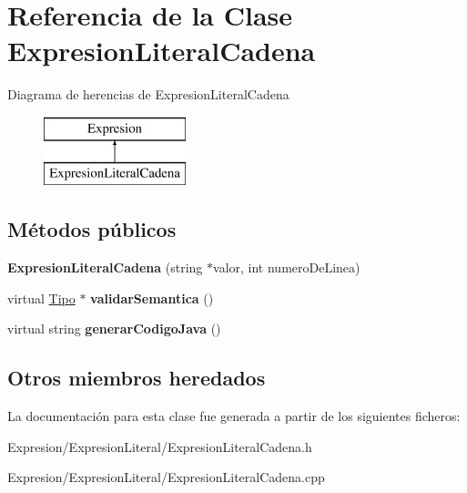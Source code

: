 \hypertarget{class_expresion_literal_cadena}{\section{Referencia de la Clase Expresion\-Literal\-Cadena}
\label{class_expresion_literal_cadena}
}
Diagrama de herencias de Expresion\-Literal\-Cadena\begin{figure}[H]
\begin{center}
\leavevmode
\includegraphics[height=2.000000cm]{class_expresion_literal_cadena}
\end{center}
\end{figure}
\subsection*{Métodos públicos}
\begin{DoxyCompactItemize}
\item 
\hypertarget{class_expresion_literal_cadena_a94d7c37cbc811885a48522b4832f1731}{{\bfseries Expresion\-Literal\-Cadena} (string $\ast$valor, int numero\-De\-Linea)}\label{class_expresion_literal_cadena_a94d7c37cbc811885a48522b4832f1731}

\item 
\hypertarget{class_expresion_literal_cadena_a0e49a3a889692e29f17e9a0064492558}{virtual \hyperlink{class_tipo}{Tipo} $\ast$ {\bfseries validar\-Semantica} ()}\label{class_expresion_literal_cadena_a0e49a3a889692e29f17e9a0064492558}

\item 
\hypertarget{class_expresion_literal_cadena_a6e2ea52a5a236281e8382d82a3a8bba7}{virtual string {\bfseries generar\-Codigo\-Java} ()}\label{class_expresion_literal_cadena_a6e2ea52a5a236281e8382d82a3a8bba7}

\end{DoxyCompactItemize}
\subsection*{Otros miembros heredados}


La documentación para esta clase fue generada a partir de los siguientes ficheros\-:\begin{DoxyCompactItemize}
\item 
Expresion/\-Expresion\-Literal/Expresion\-Literal\-Cadena.\-h\item 
Expresion/\-Expresion\-Literal/Expresion\-Literal\-Cadena.\-cpp\end{DoxyCompactItemize}
